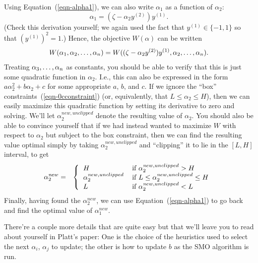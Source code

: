 \documentclass{article}
\begin{document}
Using Equation~(\ref{eqn-alpha1}), we can also write $\alpha_1$ as a
function of $\alpha_2$:
\[
\alpha_1  = (\zeta - \alpha_2 y^{(2)})y^{(1)}.
\]
(Check this derivation yourself; we again used the fact that
$y^{(1)} \in \{-1,1\}$ so that $(y^{(1)})^2=1$.) Hence, the objective $W(\alpha)$ can
be written
\[
W(\alpha_1, \alpha_2, \ldots, \alpha_{{n}}) =
W( (\zeta - \alpha_2 y^{(2)})y^{(1)}, \alpha_2, \ldots, \alpha_{{n}}).
\]
Treating $\alpha_3, \ldots, \alpha_{{n}}$ as constants, you should be able to verify that
this is just some quadratic function in $\alpha_2$.  I.e., this can also be expressed
in the form $a \alpha_2^2 + b \alpha_2 + c$ for some appropriate $a$, $b$, and $c$.
If we ignore the ``box'' constraints~(\ref{eqn-0cconstraint}) (or, equivalently, that
$L \leq \alpha_2 \leq H$), then we can easily maximize this quadratic function
by setting its derivative to zero and solving.  We'll let $\alpha_2^{\mathit new, unclipped}$
denote the resulting value of $\alpha_2$.  You should also be able to convince yourself
that if we had instead wanted to maximize $W$ with respect to $\alpha_2$ but subject to
the box constraint, then we can find the resulting value optimal simply by taking
$\alpha_2^{\mathit new, unclipped}$ and ``clipping'' it to lie in the $[L,H]$ interval,
to get
\begin{eqnarray*}
\alpha_2^{\textit new} &=& \left\{\begin{tabular}{ll}
         $H$                           & if $\alpha_2^{\textit new, unclipped} > H$  \\
         $\alpha_2^{\textit new, unclipped}$ & if $L \leq \alpha_2^{\textit new, unclipped} \leq H$  \\
         $L$                           & if $\alpha_2^{\textit new, unclipped} < L$
         \end{tabular} \right.  \\
\end{eqnarray*}
Finally, having found the $\alpha_2^{\mathit new}$, we can use Equation~(\ref{eqn-alpha1})
to go back and find the optimal value of $\alpha_1^{\mathit new}$.

There're a couple more details that are quite easy but that we'll leave you
to read about yourself in Platt's paper:  One is the choice of the heuristics used
to select the next $\alpha_i$, $\alpha_j$ to update; the other is how to
update $b$ as the SMO algorithm is run.


%
\end{document}

